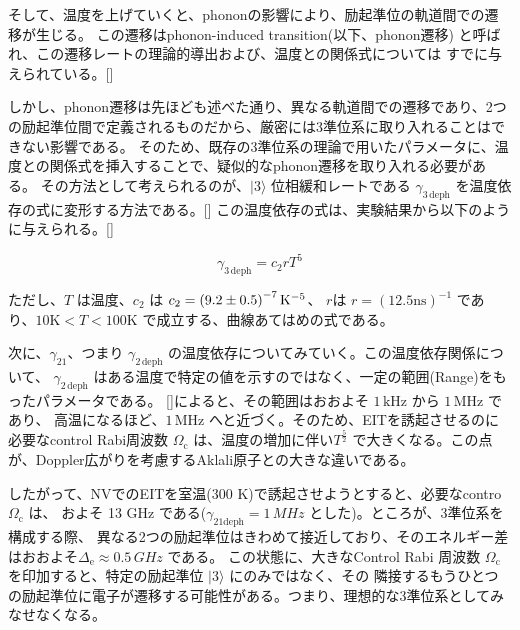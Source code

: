 \documentclass[11pt,a4paper]{ltjsarticle}
\begin{document}
そして、温度を上げていくと、phononの影響により、励起準位の軌道間での遷移が生じる。
この遷移はphonon-induced transition(以下、phonon遷移) と呼ばれ、この遷移レートの理論的導出および、温度との関係式については
すでに与えられている。[\cite{S. Ernst}]

しかし、phonon遷移は先ほども述べた通り、異なる軌道間での遷移であり、2つの励起準位間で定義されるものだから、厳密には3準位系に取り入れることはできない影響である。
そのため、既存の3準位系の理論で用いたパラメータに、温度との関係式を挿入することで、疑似的なphonon遷移を取り入れる必要がある。
その方法として考えられるのが、$| 3 \rangle$ 位相緩和レートである $\gamma_{3 \, \mathrm{deph}}$ を温度依存の式に変形する方法である。[\cite{V.M. Acosta}]
この温度依存の式は、実験結果から以下のように与えられる。[\cite{Kai-Mei C. Fu}]

\begin{equation}
\label{Kai Mei C. Fu}
  \gamma_{3 \, \mathrm{deph}} = c_{2} r T^5
\end{equation}

ただし、$T$ は温度、$c_{2}$ は $c_{2} = \left( 9.2 \pm 0.5 \right) \time 10^{-7} \mathrm{K}^{-5}$、
$r$は $r = { \left( 12.5 \mathrm{ns} \right) }^{-1}$ であり、$10 \mathrm{K} < T < 100 \mathrm{K} $
で成立する、曲線あてはめの式である。


次に、$\gamma_{21}$、つまり $\gamma_{2 \, \mathrm{deph}}$ の温度依存についてみていく。この温度依存関係について、
$\gamma_{2 \, \mathrm{deph}}$ はある温度で特定の値を示すのではなく、一定の範囲(Range)をもったパラメータである。
[\cite{N. Bar-Gill}]によると、その範囲はおおよそ $1 \, \mathrm{kHz}$ から $1 \, \mathrm{MHz}$ であり、
高温になるほど、$1 \, \mathrm{MHz}$ へと近づく。そのため、EITを誘起させるのに必要なcontrol Rabi周波数 $\Omega_{\mathrm{c}}$
は、温度の増加に伴い$T^{\frac{5}{2}}$ で大きくなる。この点が、Doppler広がりを考慮するAklali原子との大きな違いである。

したがって、NVでのEITを室温(300 K)で誘起させようとすると、必要なcontro $\Omega_{\mathrm{c}}$ は、
およそ 13 GHz である($\gamma_{21 \mathrm{deph}} = 1 \,MHz$ とした)。ところが、3準位系を構成する際、
異なる2つの励起準位はきわめて接近しており、そのエネルギー差はおおよそ$\Delta_{\mathrm{e}} \approx 0.5 \, GHz$ である。
この状態に、大きなControl Rabi 周波数 $\Omega_{\mathrm{c}}$ を印加すると、特定の励起準位 $| 3 \rangle$ にのみではなく、その
隣接するもうひとつの励起準位に電子が遷移する可能性がある。つまり、理想的な3準位系としてみなせなくなる。



\end{document}

